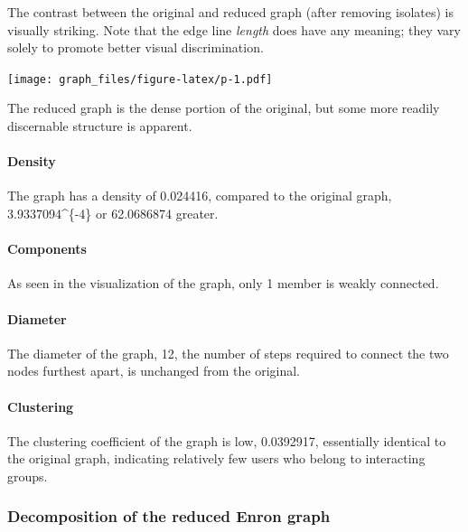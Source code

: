 \documentclass[]{article}
\let\oldparagraph\paragraph
\renewcommand{\paragraph}[1]{\oldparagraph{#1}\mbox{}}
\begin{document}
The contrast between the original and reduced graph (after removing
isolates) is visually striking. Note that the edge line \emph{length}
does have any meaning; they vary solely to promote better visual
discrimination.

\texttt{[image: graph\_files/figure-latex/p-1.pdf]}

The reduced graph is the dense portion of the original, but some more
readily discernable structure is apparent.

\hypertarget{density-1}{%
\paragraph{Density}\label{density-1}}

The graph has a density of 0.024416, compared to the original graph,
3.9337094\^{}\{-4\} or 62.0686874 greater.

\hypertarget{components-1}{%
\paragraph{Components}\label{components-1}}

As seen in the visualization of the graph, only 1 member is weakly
connected.

\hypertarget{diameter-1}{%
\paragraph{Diameter}\label{diameter-1}}

The diameter of the graph, 12, the number of steps required to connect
the two nodes furthest apart, is unchanged from the original.

\hypertarget{clustering-1}{%
\paragraph{Clustering}\label{clustering-1}}

The clustering coefficient of the graph is low, 0.0392917, essentially
identical to the original graph, indicating relatively few users who
belong to interacting groups.

\hypertarget{decomposition-of-the-reduced-enron-graph}{%
\subsubsection{Decomposition of the reduced Enron
graph}\label{decomposition-of-the-reduced-enron-graph}}
\end{document}
